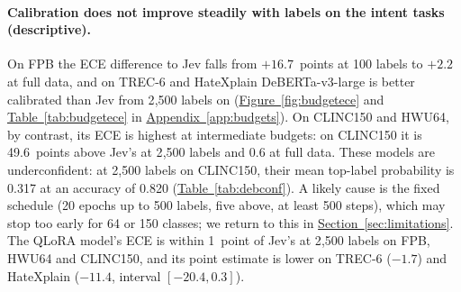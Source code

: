 \paragraph{Calibration does not improve steadily with labels on the intent tasks (descriptive).}
On FPB the ECE difference to Jev falls from $+16.7$~points at 100 labels to $+2.2$ at full data, and on TREC-6 and
HateXplain DeBERTa-v3-large is better calibrated than Jev from 2{,}500 labels on
(\hyperref[fig:budgetece]{Figure~\ref*{fig:budgetece}} and \hyperref[tab:budgetece]{Table~\ref*{tab:budgetece}} in
\hyperref[app:budgets]{Appendix~\ref*{app:budgets}}). On CLINC150 and HWU64, by contrast, its ECE is highest at
intermediate budgets: on CLINC150 it is 49.6~points above Jev's at 2{,}500 labels and 0.6 at full data. These models are
underconfident: at 2{,}500 labels on CLINC150, their mean top-label probability is 0.317 at an accuracy of 0.820
(\hyperref[tab:debconf]{Table~\ref*{tab:debconf}}). A likely cause is the fixed schedule (20 epochs up to 500 labels, five above, at least 500
steps), which may stop too early for 64 or 150 classes; we return to this in
\hyperref[sec:limitations]{Section~\ref*{sec:limitations}}. The QLoRA model's ECE is within 1~point of Jev's at
2{,}500 labels on FPB, HWU64 and CLINC150, and its point estimate is lower on TREC-6 ($-1.7$) and HateXplain ($-11.4$,
interval $[-20.4, 0.3]$).

